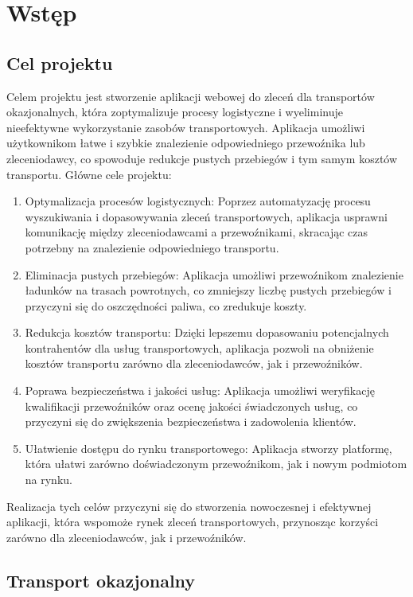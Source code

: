 \chapter{Wstęp}

\section{Cel projektu}

Celem projektu jest stworzenie aplikacji webowej do zleceń dla transportów okazjonalnych, która zoptymalizuje procesy logistyczne i wyeliminuje nieefektywne wykorzystanie zasobów transportowych. Aplikacja umożliwi użytkownikom łatwe i szybkie znalezienie odpowiedniego przewoźnika lub zleceniodawcy, co spowoduje redukcje pustych przebiegów i tym samym kosztów transportu.
Główne cele projektu:
\begin{enumerate}
\item Optymalizacja procesów logistycznych: Poprzez automatyzację procesu wyszukiwania i dopasowywania zleceń transportowych, aplikacja usprawni komunikację między zleceniodawcami a przewoźnikami, skracając czas potrzebny na znalezienie odpowiedniego transportu.
\item Eliminacja pustych przebiegów: Aplikacja umożliwi przewoźnikom znalezienie ładunków na trasach powrotnych, co zmniejszy liczbę pustych przebiegów i przyczyni się do oszczędności paliwa, co zredukuje koszty.
\item Redukcja kosztów transportu: Dzięki lepszemu dopasowaniu potencjalnych kontrahentów dla usług transportowych, aplikacja pozwoli na obniżenie kosztów transportu zarówno dla zleceniodawców, jak i przewoźników.
\item Poprawa bezpieczeństwa i jakości usług: Aplikacja umożliwi weryfikację kwalifikacji przewoźników oraz ocenę jakości świadczonych usług, co przyczyni się do zwiększenia bezpieczeństwa i zadowolenia klientów.
\item Ułatwienie dostępu do rynku transportowego: Aplikacja stworzy platformę, która ułatwi zarówno doświadczonym przewoźnikom, jak i nowym podmiotom na rynku. 
\end{enumerate}
Realizacja tych celów przyczyni się do stworzenia nowoczesnej i efektywnej aplikacji, która wspomoże rynek zleceń transportowych, przynosząc korzyści zarówno dla zleceniodawców, jak i przewoźników.

\section{Transport okazjonalny}

